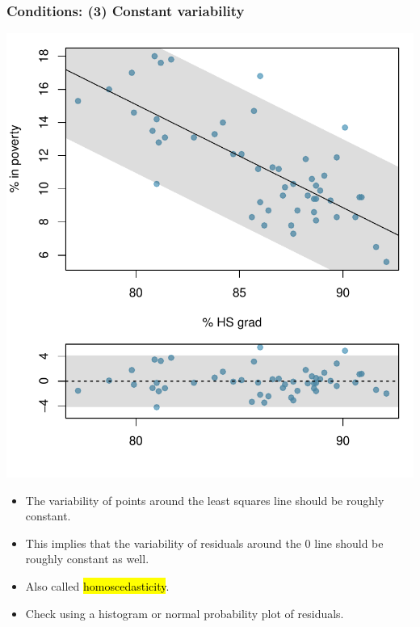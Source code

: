 \begin{frame}
\frametitle{Conditions: (3) Constant variability}

{
\begin{center}
\includegraphics[width=\textwidth]{7-2_least_square_reg/figures/poverty/poverty_hsgrad_tube}
\end{center}
}
{
\begin{itemize}

\item The variability of points around the least squares line should be roughly constant.

\pause

\item This implies that the variability of residuals around the 0 line should be roughly constant as well.

\pause

\item Also called \hl{homoscedasticity}.

\pause

\item Check using a histogram or normal probability plot of residuals.

\end{itemize}
}


\end{frame}

